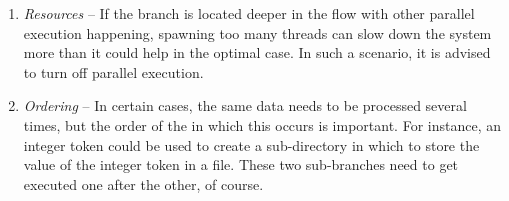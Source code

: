 \begin{enumerate}
  \item \textit{Resources} -- If the branch is located deeper in the flow with
  other parallel execution happening, spawning too many threads can slow down
  the system more than it could help in the optimal case. In such a scenario, it
  is advised to turn off parallel execution.
  \item \textit{Ordering} -- In certain cases, the same data needs to be
  processed several times, but the order of the in which this occurs is
  important. For instance, an integer token could be used to create a
  sub-directory in which to store the value of the integer token in a file.
  These two sub-branches need to get executed one after the other, of course.
\end{enumerate}

